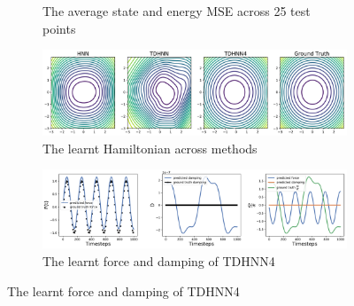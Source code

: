\documentclass[twoside]{article}
\begin{document}
\begin{figure}[!htb]
\begin{subfigure}[b]{0.48\textwidth}
\caption{The average state and energy MSE across 25 test points}
\end{subfigure}
\begin{subfigure}[b]{0.48\textwidth}
\includegraphics[width=\textwidth]{figures/figures/forced_mass_spring/1/forced_mass_spring_hamiltonian_0.pdf}
\caption{The learnt Hamiltonian across methods}
\end{subfigure}
\begin{subfigure}[b]{0.48\textwidth}
\includegraphics[width=\textwidth]{figures/figures/forced_mass_spring/1/forced_mass_spring_dpdt_0.pdf}
\caption{The learnt force and damping of TDHNN4}
\end{subfigure}
\label{forced_mspring_1_full}
\end{figure}
\end{document}
